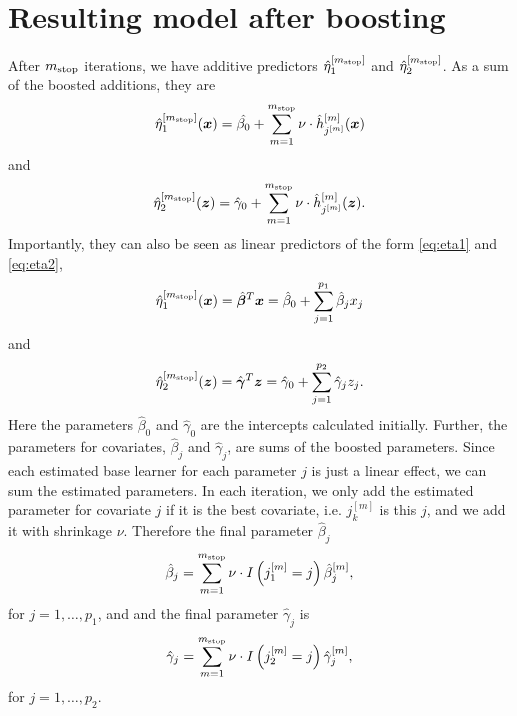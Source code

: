\section{Resulting model after boosting}
After $m_{\text{stop}}$ iterations, we have additive predictors $\hat{\eta}_1^{[m_{\text{stop}}]}$ and $\hat{\eta}_2^{[m_{\text{stop}}]}$.
As a sum of the boosted additions, they are
\begin{equation*}
    \hat{\eta}_1^{[m_{\text{stop}}]}(\bm{x})=\hat{\beta_0}+\sum_{m=1}^{m_{\text{stop}}}\nu\cdot \hat{h}_{j^{[m]}}^{[m]}(\bm{x})
\end{equation*}
and
\begin{equation*}
    \hat{\eta}_2^{[m_{\text{stop}}]}(\bm{z})=\hat{\gamma}_0+\sum_{m=1}^{m_{\text{stop}}}\nu\cdot \hat{h}_{j^{[m]}}^{[m]}(\bm{z}).
\end{equation*}
Importantly, they can also be seen as linear predictors of the form \eqref{eq:eta1} and \eqref{eq:eta2},
\begin{equation*}
    \hat{\eta}_1^{[m_{\text{stop}}]}(\bm{x})=\hat{\boldsymbol{\beta}}^T\bm{x}=\hat{\beta}_0+\sum_{j=1}^{p_1}\hat{\beta}_jx_j
\end{equation*}
and
\begin{equation*}
    \hat{\eta}_2^{[m_{\text{stop}}]}(\bm{z})=\hat{\boldsymbol{\gamma}}^T\bm{z}=\hat{\gamma}_0+\sum_{j=1}^{p_2}\hat{\gamma}_jz_j.
\end{equation*}
Here the parameters $\hat{\beta}_0$ and $\hat{\gamma}_0$ are the intercepts calculated initially.
Further, the parameters for covariates, $\hat{\beta}_j$ and $\hat{\gamma}_j$, are sums of the boosted parameters.
Since each estimated base learner for each parameter $j$ is just a linear effect, we can sum the estimated parameters.
In each iteration, we only add the estimated parameter for covariate $j$ if it is the best covariate, i.e. $j_k^{[m]}$ is this $j$, and we add it with shrinkage $\nu$.
Therefore the final parameter $\hat{\beta}_j$
\begin{equation*}
    \hat{\beta}_j=\sum_{m=1}^{m_{\text{stop}}}\nu\cdot I\left(j_1^{[m]}=j\right)\hat{\beta}_j^{[m]},
\end{equation*}
for $j=1,\ldots,p_1$, and
and the final parameter $\hat{\gamma}_j$ is
\begin{equation*}
    \hat{\gamma}_j=\sum_{m=1}^{m_{\text{stop}}}\nu\cdot I\left(j_2^{[m]}=j\right)\hat{\gamma}_j^{[m]},
\end{equation*}
for $j=1,\ldots,p_2$.


